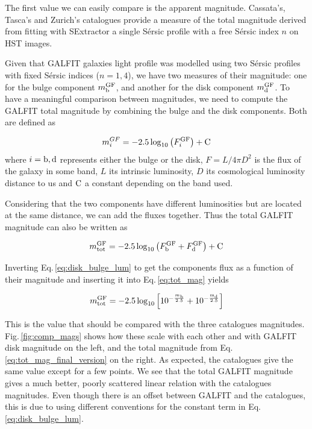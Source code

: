 The first value we can easily compare is the apparent magnitude. Cassata's, Tasca's and Zurich's catalogues provide a measure of the total magnitude derived from fitting with SExtractor a single Sérsic profile with a free Sérsic index $n$ on HST images.

Given that GALFIT galaxies light profile was modelled using two Sérsic profiles with fixed Sérsic indices ($n = 1, 4$), we have two measures of their magnitude: one for the bulge component $m_{\rm{b}}^{\rm{GF}}$, and another for the disk component $m_{\rm{d}}^{\rm{GF}}$. To have a meaningful comparison between magnitudes, we need to compute the GALFIT total magnitude by combining the bulge and the disk components. Both are defined as

\begin{equation}
	m_i^{GF} = -2.5 \log_{10} \left ( F_i^{\rm{GF}} \right ) + \rm{C}
	\label{eq:disk_bulge_lum}
\end{equation}
 where $i = \rm{b, d}$ represents either the bulge or the disk, $F = L/{4 \pi D^2}$ is the flux of the galaxy in some band, $L$ its intrinsic luminosity, $D$ its cosmological luminosity distance to us and $\rm{C}$ a constant depending on the band used.

Considering that the two components have different luminosities but are located at the same distance, we can add the fluxes together. Thus the total GALFIT magnitude can also be written as

\begin{equation}
	m_{\rm{tot}}^{\rm{GF}} = - 2.5 \log_{10} \left ( F_{\rm{b}}^{\rm{GF}}  + F_{\rm{d}}^{\rm{GF}} \right ) + \rm{C}
	\label{eq:tot_mag}
\end{equation}

Inverting Eq.\,\ref{eq:disk_bulge_lum} to get the components flux as a function of their magnitude and inserting it into Eq.\,\ref{eq:tot_mag} yields

\begin{equation}
	m_{\rm{tot}}^{\rm{GF}} = -2.5 \log_{10} \left [ 10^{-\frac{m_{\rm{b}}}{2.5}} + 10^{-\frac{\rm{m_d}}{2.5}} \right ]
	\label{eq:tot_mag_final_version}
\end{equation}

This is the value that should be compared with the three catalogues magnitudes. Fig.\,\ref{fig:comp_mags} shows how these scale with each other and with GALFIT disk magnitude on the left, and the total magnitude from Eq.\,\ref{eq:tot_mag_final_version} on the right. As expected, the catalogues give the same value except for a few points. We see that the total GALFIT magnitude gives a much better, poorly scattered linear relation with the catalogues magnitudes. Even though there is an offset between GALFIT and the catalogues, this is due to using different conventions for the constant term in Eq.\,\ref{eq:disk_bulge_lum}.

